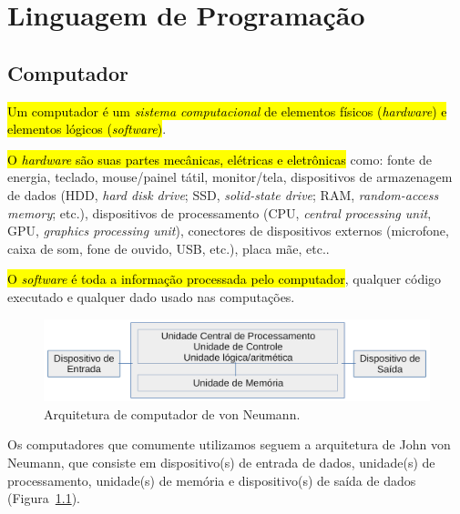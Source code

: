 
\chapter{Linguagem de Programação}\label{cap_lingua}

\section{Computador}\label{cap_lim_sec_computador}

\hl{Um computador é um \emph{sistema computacional} de elementos físicos (\emph{hardware}) e elementos lógicos (\emph{software})}.

\hl{O \emph{hardware} são suas partes mecânicas, elétricas e eletrônicas} como: fonte de energia, teclado, mouse/painel tátil, monitor/tela, dispositivos de armazenagem de dados (HDD, \textit{hard disk drive}; SSD, \textit{solid-state drive}; RAM, \textit{random-access memory}; etc.), dispositivos de processamento (CPU, \textit{central processing unit}, GPU, \textit{graphics processing unit}), conectores de dispositivos externos (microfone, caixa de som, fone de ouvido, USB, etc.), placa mãe, etc..

\hl{O \emph{software} é toda a informação processada pelo computador}, qualquer código executado e qualquer dado usado nas computações.

\begin{figure}[H]
  \centering
  \includegraphics[width=4.75in]{./cap_lingua/dados/fig_arqVonNeumann/fig.png}
  \caption[Arquitetura de von Neumann]{Arquitetura de computador de von Neumann.}
  \label{cap_lim_sec_computador:fig:arqVonNeumann}
\end{figure}

Os computadores que comumente utilizamos seguem a arquitetura de John von Neumann{\vonNeumann}, que consiste em dispositivo(s) de entrada de dados, unidade(s) de processamento, unidade(s) de memória e dispositivo(s) de saída de dados (Figura~\ref{cap_lim_sec_computador:fig:arqVonNeumann}).

